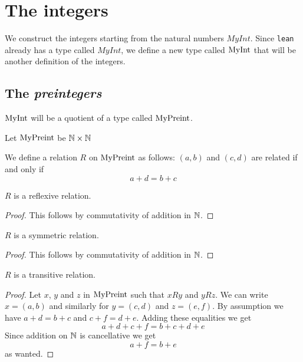 \chapter{The integers}

We construct the integers starting from the natural numbers $MyInt$. Since \texttt{lean} already has a
type called $MyInt$, we define a new type called $\mathrm{MyInt}$ that will be another definition of the integers.

\section{The \emph{preintegers}}

$\mathrm{MyInt}$ will be a quotient of a type called $\mathrm{MyPreint}$.

\begin{definition}
    \label{MyPreint}
    \leanok
    Let $\mathrm{MyPreint}$ be $\mathbb{N} \times \mathbb{N}$
\end{definition}

\begin{definition}
    \label{MyPreint.R}
    \leanok
We define a relation $R$ on $\mathrm{MyPreint}$ as follows: $(a,b)$ and $(c, d)$ are related if and only if
\[
a + d = b + c
\]
\end{definition}

\begin{lemma}
$R$ is a reflexive relation.
    \label{MyPreint.R_refl}
    \leanok
\end{lemma}
\begin{proof}
    \leanok
    This follows by commutativity of addition in $\mathbb{N}$.
\end{proof}

\begin{lemma}
$R$ is a symmetric relation.
    \label{MyPreint.R_symm}
    \leanok
\end{lemma}
\begin{proof}
    \leanok
    This follows by commutativity of addition in $\mathbb{N}$.
\end{proof}

\begin{lemma}
$R$ is a transitive relation.
    \label{MyPreint.R_trans}
    \leanok
\end{lemma}
\begin{proof}
    \leanok
    Let $x$, $y$ and $z$ in $\mathrm{MyPreint}$ such that $x R y$ and $y R z$. We can write $x = (a,b)$ and similarly
    for $y = (c,d)$ and $z = (e,f)$. By assumption we have $a+d=b+c$ and $c+f=d+e$. Adding these equalities we get
    \[
    a+d+c+f=b+c+d+e
    \]
    Since addition on $\mathbb{N}$ is cancellative we get
    \[
    a+f = b + e
    \]
    as wanted.
\end{proof}

